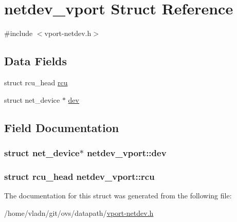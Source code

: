 \hypertarget{structnetdev__vport}{}\section{netdev\+\_\+vport Struct Reference}
\label{structnetdev__vport}


{\ttfamily \#include $<$vport-\/netdev.\+h$>$}

\subsection*{Data Fields}
\begin{DoxyCompactItemize}
\item 
struct rcu\+\_\+head \hyperlink{structnetdev__vport_ad3844aef4d3d1f85e7eec5529676b91d}{rcu}
\item 
struct net\+\_\+device $\ast$ \hyperlink{structnetdev__vport_acf4ee248f7385e2f987fd2736f824ca9}{dev}
\end{DoxyCompactItemize}


\subsection{Field Documentation}
\hypertarget{structnetdev__vport_acf4ee248f7385e2f987fd2736f824ca9}{}
\subsubsection[{dev}]{\setlength{\rightskip}{0pt plus 5cm}struct net\+\_\+device$\ast$ netdev\+\_\+vport\+::dev}\label{structnetdev__vport_acf4ee248f7385e2f987fd2736f824ca9}
\hypertarget{structnetdev__vport_ad3844aef4d3d1f85e7eec5529676b91d}{}
\subsubsection[{rcu}]{\setlength{\rightskip}{0pt plus 5cm}struct rcu\+\_\+head netdev\+\_\+vport\+::rcu}\label{structnetdev__vport_ad3844aef4d3d1f85e7eec5529676b91d}


The documentation for this struct was generated from the following file\+:\begin{DoxyCompactItemize}
\item 
/home/vladn/git/ovs/datapath/\hyperlink{vport-netdev_8h}{vport-\/netdev.\+h}\end{DoxyCompactItemize}

